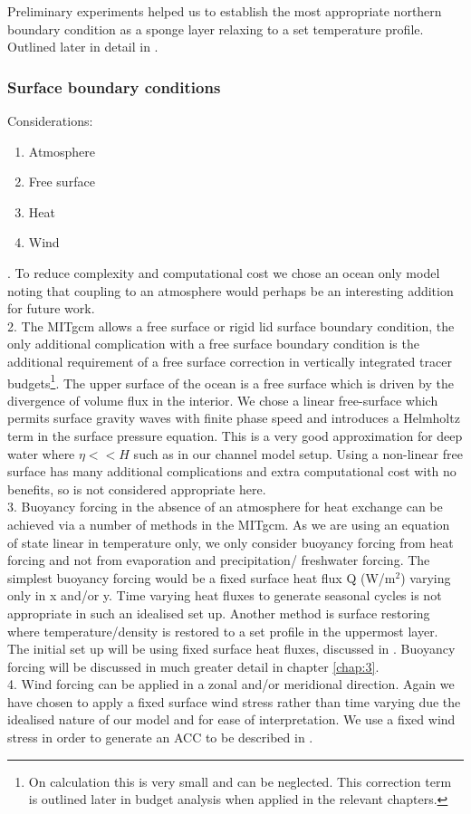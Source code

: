 Preliminary experiments helped us to establish the most appropriate northern boundary condition as a sponge layer relaxing to a set temperature profile. Outlined later in detail in .
\subsubsection*{Surface boundary conditions}
Considerations:
\singlespacing
\begin{enumerate}
\item Atmosphere
\item Free surface
\item Heat
\item Wind
\end{enumerate}

. To reduce complexity and computational cost we chose an ocean only model noting that coupling to an atmosphere would perhaps be an interesting addition for future work.\\
2. The MITgcm allows a free surface or rigid lid surface boundary condition, the only additional complication with a free surface boundary condition is the additional requirement of a free surface correction in vertically integrated tracer budgets\footnote{On calculation this is very small and can be neglected. This correction term is outlined later in budget analysis when applied in the relevant chapters.}. The upper surface of the ocean is a free surface which is driven by the divergence of volume flux in the interior. We chose a linear free-surface which permits surface gravity waves with finite phase speed and introduces a Helmholtz term in the surface pressure equation. This is a very good approximation for deep water where $\eta << H$ \citep{Campin2004} such as in our channel model setup. Using a non-linear free surface has many additional complications and extra computational cost with no benefits, so is not considered appropriate here.\\
3. Buoyancy forcing in the absence of an atmosphere for heat exchange can be achieved via a number of methods in the MITgcm. As we are using an equation of state linear in temperature only, we only consider buoyancy forcing from heat forcing and not from evaporation and precipitation/ freshwater forcing. The simplest buoyancy forcing would be a fixed surface heat flux Q (W/m$^2$) varying only in x and/or y. Time varying heat fluxes to generate seasonal cycles is not appropriate in such an idealised set up. Another method is surface restoring where temperature/density is restored to a set profile in the uppermost layer. The initial set up will be using fixed surface heat fluxes, discussed in . Buoyancy forcing will be discussed in much greater detail in chapter \ref{chap:3}. \\
4. Wind forcing can be applied in a zonal and/or meridional direction. Again we have chosen to apply a fixed surface wind stress rather than time varying due the idealised nature of our model and for ease of interpretation. We use a fixed wind stress in order to generate an \gls{ACC} to be described in .



